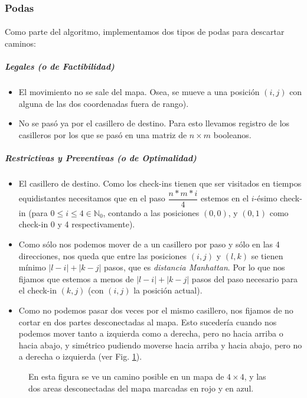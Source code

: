 \documentclass[./main.tex]{subfiles}
\begin{document}
\subsubsection{Podas}
\label{sec:ej1-podas}

\paragraph{} Como parte del algoritmo, implementamos dos tipos de podas para descartar caminos:
\subparagraph{Legales (o de Factibilidad)}
\begin{itemize}
  \item El movimiento no se sale del mapa. Osea, se mueve a una posición \((i, j)\) con alguna de las dos coordenadas fuera de rango).
  \item No se pasó ya por el casillero de destino. Para esto llevamos registro de los casilleros por los que se pasó en una matriz de \(n \times m\) booleanos.
\end{itemize}

\subparagraph{Restrictivas y Preventivas (o de Optimalidad)}
\begin{itemize}
  \item El casillero de destino. Como los check-ins tienen que ser visitados en tiempos equidistantes necesitamos que en el paso \(\dfrac{n*m*i}{4}\) estemos en el \(i\)-ésimo check-in (para \(0 \leq i \leq 4 \in \mathbb{N}_0\), contando a las posiciones \((0, 0)\), y \((0, 1)\) como check-in 0 y 4 respectivamente).
  \item Como sólo nos podemos mover de a un casillero por paso y sólo en las 4 direcciones, nos queda que entre las posiciones \((i, j)\) y \((l, k)\) se tienen mínimo \(|l-i| + |k-j|\) pasos, que es \textit{distancia Manhattan}. Por lo que nos fijamos que estemos a menos de \(|l-i| + |k-j|\) pasos del paso necesario para el check-in \((k, j)\) (con \((i, j)\) la posición actual).
  \item Como no podemos pasar dos veces por el mismo casillero, nos fijamos de no cortar en dos partes desconectadas al mapa. Esto sucedería cuando nos podemos mover tanto a izquierda como a derecha, pero no hacia arriba o hacia abajo, y simétrico pudiendo moverse hacia arriba y hacia abajo, pero no a derecha o izquierda (ver Fig. \ref{fig:ej1-mitad}).
\end{itemize}

\begin{figure}[H]
\centering


\caption{En esta figura se ve un camino posible en un mapa de \(4 \times 4\), y las dos areas desconectadas del mapa marcadas en rojo y en azul.}
\label{fig:ej1-mitad}
\end{figure}
\end{document}
